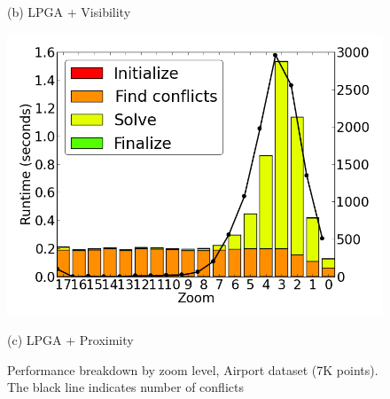 \begin{figure}[tb]
\begin{minipage}{0.329\linewidth}
    \centerline{(b) LPGA + Visibility}
  \end{minipage} \hfill
  \begin{minipage}{0.329\linewidth}
    \centerline{\includegraphics[width=0.9\linewidth]{./figs/prelim_pnt_7k_airports_lp_B.png}}
    \centerline{(c) LPGA + Proximity}
  \end{minipage}
  \vspace{-1ex}
  \caption{Performance breakdown by zoom level, Airport dataset (7K points). The black line indicates number of conflicts} \label{fig:performance:airport}
  \vspace{-2ex}
\end{figure}

